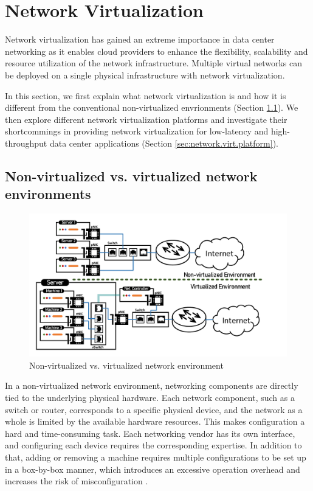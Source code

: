 \section{Network Virtualization}

Network virtualization has gained an extreme importance in data center networking
as it enables cloud providers to enhance the flexibility, scalability 
and resource utilization of the network infrastructure. Multiple virtual 
networks can be deployed on a single physical infrastructure with 
network virtualization. 

In this section, we first explain what network virtualization is and how it is 
different from the conventional non-virtualized envrionments 
(Section \ref{sec:nonvirt.vs.virt}). We then explore different network virtualization
platforms and investigate their shortcommings in providing network virtualization 
for low-latency and high-throughput data center applications (Section \ref{sec:network.virt.platform}).


\subsection{Non-virtualized vs. virtualized network environments}
\label{sec:nonvirt.vs.virt}

\begin{figure}
    \centering
    \includegraphics[scale=0.625]{../Figures/non-virt-vs-virt.pdf}
    \caption{Non-virtualized vs. virtualized network environment}
    \label{fig:overhead.throughput}
\end{figure}



In a non-virtualized network environment, networking components are directly tied 
to the underlying physical hardware. Each network component, such as a switch or router, 
corresponds to a specific physical device, and the network as a whole is limited by the 
available hardware resources. This makes configuration a hard and 
time-consuming task. Each networking vendor has its own interface, and configuring each 
device requires the corresponding expertise. In addition to that, adding or removing a machine 
requires multiple configurations to be set up in a box-by-box manner, which introduces 
an excessive operation overhead and increases the risk of misconfiguration 
\cite{cearley2013top, marty2019snap}.

